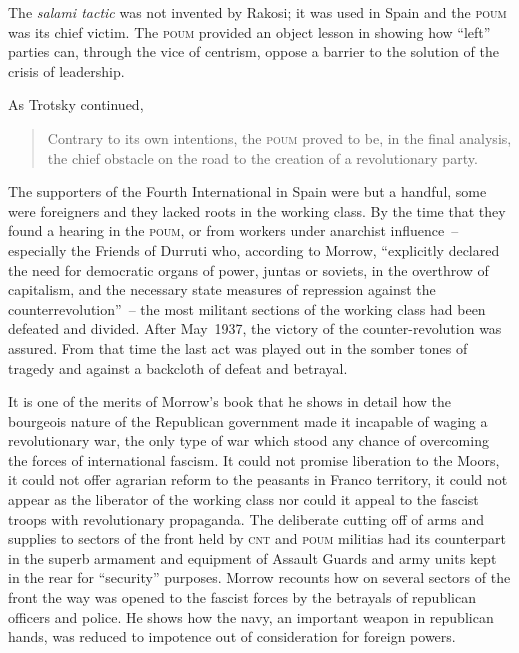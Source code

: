 The \emph{salami tactic} was not invented by Rakosi; it was used in Spain and the \textsc{poum} was its chief victim. The \textsc{poum} provided an object lesson in showing how ``left'' parties can, through the vice of centrism, oppose a barrier to the solution of the crisis of leadership.

\smallskip

As Trotsky continued,

\begin{quotation}
  Contrary to its own intentions, the \textsc{poum} proved to be, in the final analysis, the chief obstacle on the road to the creation of a revolutionary party.
\end{quotation}

The supporters of the Fourth International in Spain were but a handful, some were foreigners and they lacked roots in the working class. By the time that they found a hearing in the \textsc{poum}, or from workers under anarchist influence~-- especially the Friends of Durruti who, according to Morrow, ``explicitly declared the need for democratic organs of power, juntas or soviets, in the overthrow of capitalism, and the necessary state measures of repression against the counterrevolution''~-- the most militant sections of the working class had been defeated and divided. After May~1937, the victory of the counter-revolution was assured. From that time the last act was played out in the somber tones of tragedy and against a backcloth of defeat and betrayal.

\dinkus

It is one of the merits of Morrow’s book that he shows in detail how the bourgeois nature of the Republican government made it incapable of waging a revolutionary war, the only type of war which stood any chance of overcoming the forces of international fascism. It could not promise liberation to the Moors, it could not offer agrarian reform to the peasants in Franco territory, it could not appear as the liberator of the working class nor could it appeal to the fascist troops with revolutionary propaganda. The deliberate cutting off of arms and supplies to sectors of the front held by \textsc{cnt} and \textsc{poum} militias had its counterpart in the superb armament and equipment of Assault Guards and army units kept in the rear for ``security'' purposes. Morrow recounts how on several sectors of the front the way was opened to the fascist forces by the betrayals of republican officers and police. He shows how the navy, an important weapon in republican hands, was reduced to impotence out of consideration for foreign powers.

